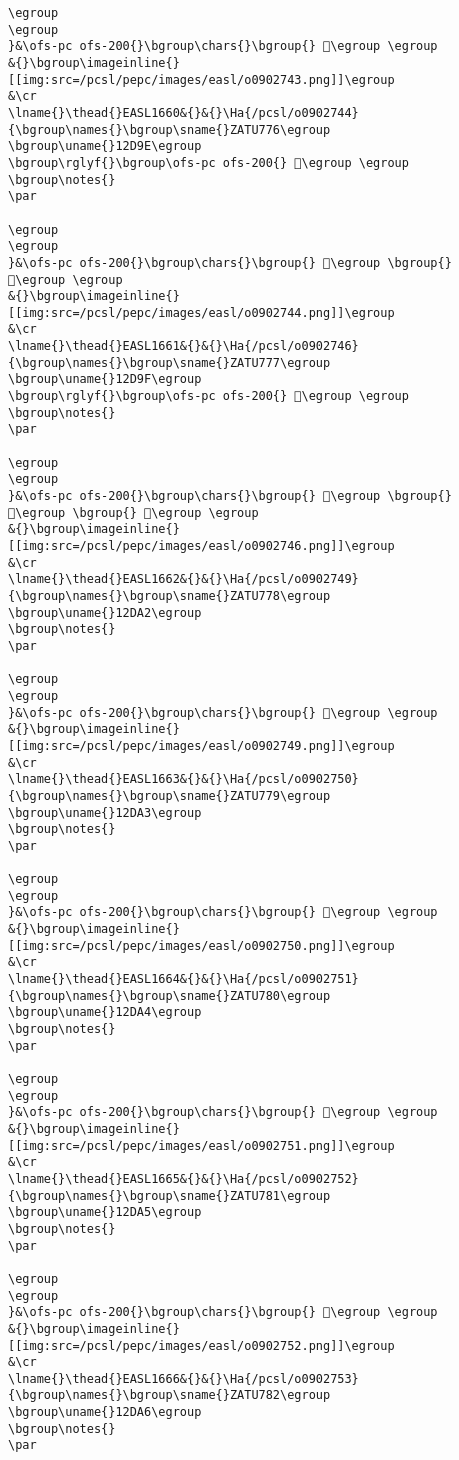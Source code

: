 \begin{verbatim}
\egroup
\egroup
}&\ofs-pc ofs-200{}\bgroup\chars{}\bgroup{} 𒶜\egroup \egroup
&{}\bgroup\imageinline{}[[img:src=/pcsl/pepc/images/easl/o0902743.png]]\egroup
&\cr
\lname{}\thead{}EASL1660&{}&{}\Ha{/pcsl/o0902744}{\bgroup\names{}\bgroup\sname{}ZATU776\egroup
\bgroup\uname{}12D9E\egroup
\bgroup\rglyf{}\bgroup\ofs-pc ofs-200{} 𒶞\egroup \egroup
\bgroup\notes{}
\par 

\egroup
\egroup
}&\ofs-pc ofs-200{}\bgroup\chars{}\bgroup{} 𒶞\egroup \bgroup{} 𒶝\egroup \egroup
&{}\bgroup\imageinline{}[[img:src=/pcsl/pepc/images/easl/o0902744.png]]\egroup
&\cr
\lname{}\thead{}EASL1661&{}&{}\Ha{/pcsl/o0902746}{\bgroup\names{}\bgroup\sname{}ZATU777\egroup
\bgroup\uname{}12D9F\egroup
\bgroup\rglyf{}\bgroup\ofs-pc ofs-200{} 𒶟\egroup \egroup
\bgroup\notes{}
\par 

\egroup
\egroup
}&\ofs-pc ofs-200{}\bgroup\chars{}\bgroup{} 𒶟\egroup \bgroup{} 𒶠\egroup \bgroup{} 𒶡\egroup \egroup
&{}\bgroup\imageinline{}[[img:src=/pcsl/pepc/images/easl/o0902746.png]]\egroup
&\cr
\lname{}\thead{}EASL1662&{}&{}\Ha{/pcsl/o0902749}{\bgroup\names{}\bgroup\sname{}ZATU778\egroup
\bgroup\uname{}12DA2\egroup
\bgroup\notes{}
\par 

\egroup
\egroup
}&\ofs-pc ofs-200{}\bgroup\chars{}\bgroup{} 𒶢\egroup \egroup
&{}\bgroup\imageinline{}[[img:src=/pcsl/pepc/images/easl/o0902749.png]]\egroup
&\cr
\lname{}\thead{}EASL1663&{}&{}\Ha{/pcsl/o0902750}{\bgroup\names{}\bgroup\sname{}ZATU779\egroup
\bgroup\uname{}12DA3\egroup
\bgroup\notes{}
\par 

\egroup
\egroup
}&\ofs-pc ofs-200{}\bgroup\chars{}\bgroup{} 𒶣\egroup \egroup
&{}\bgroup\imageinline{}[[img:src=/pcsl/pepc/images/easl/o0902750.png]]\egroup
&\cr
\lname{}\thead{}EASL1664&{}&{}\Ha{/pcsl/o0902751}{\bgroup\names{}\bgroup\sname{}ZATU780\egroup
\bgroup\uname{}12DA4\egroup
\bgroup\notes{}
\par 

\egroup
\egroup
}&\ofs-pc ofs-200{}\bgroup\chars{}\bgroup{} 𒶤\egroup \egroup
&{}\bgroup\imageinline{}[[img:src=/pcsl/pepc/images/easl/o0902751.png]]\egroup
&\cr
\lname{}\thead{}EASL1665&{}&{}\Ha{/pcsl/o0902752}{\bgroup\names{}\bgroup\sname{}ZATU781\egroup
\bgroup\uname{}12DA5\egroup
\bgroup\notes{}
\par 

\egroup
\egroup
}&\ofs-pc ofs-200{}\bgroup\chars{}\bgroup{} 𒶥\egroup \egroup
&{}\bgroup\imageinline{}[[img:src=/pcsl/pepc/images/easl/o0902752.png]]\egroup
&\cr
\lname{}\thead{}EASL1666&{}&{}\Ha{/pcsl/o0902753}{\bgroup\names{}\bgroup\sname{}ZATU782\egroup
\bgroup\uname{}12DA6\egroup
\bgroup\notes{}
\par 


\end{verbatim}
